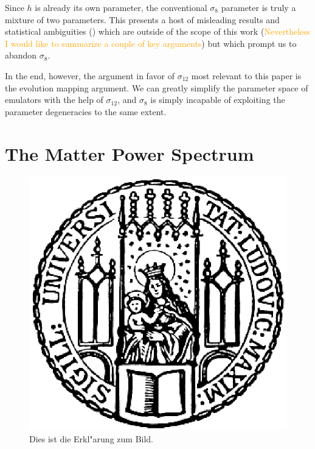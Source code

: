 Since $h$ is already its own parameter, the conventional $\sigma_8$ parameter 
is truly a mixture of two parameters. This presents a host of misleading 
results and statistical ambiguities () which are outside of the 
scope of this work (\textcolor{orange}{Nevertheless I would like to summarize 
a couple of key arguments}) but which prompt us to abandon $\sigma_8$.

In the end, however, the argument in favor of $\sigma_{12}$ most relevant to
this paper is the evolution mapping argument. We can greatly simplify the
parameter space of emulators with the help of $\sigma_{12}$, and $\sigma_8$
is simply incapable of exploiting the parameter degeneracies to the same
extent.
 

\section{The Matter Power Spectrum}
\label{sec: Pk_intro}


\begin{figure}[htb]
  \centering
  \includegraphics[scale=0.5]{siegel}
  \caption[Kurzform f"ur das Abbildungsverzeichnis]{Dies ist die Erkl"arung zum Bild.}
\end{figure}

